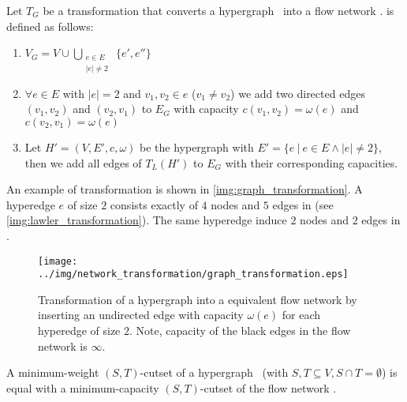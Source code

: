\begin{definition}
Let $T_G$ be a transformation that converts a hypergraph \HypergraphDef~into 
a flow network .  is defined as follows:
\begin{enumerate}
\item $V_G = V \cup \bigcup\limits_{\substack{e \in E \\ |e| \neq 2}}\ \{e', e''\}$
\item $\forall e \in E$ with $|e| = 2$ and $v_1,v_2 \in e$ ($v_1 \neq v_2$) we add 
      two directed edges $(v_1,v_2)$ and $(v_2,v_1)$ to $E_G$ with capacity $c(v_1,v_2) = \omega(e)$
      and $c(v_2,v_1) = \omega(e)$
\item Let $H' = (V,E',c,\omega)$ be the hypergraph with $E' = \{e\ |\ e \in E \land |e| \neq 2\}$,
      then we add all edges of $T_L(H')$ to $E_G$ with their corresponding capacities.
\end{enumerate} 
\end{definition}

An example of transformation  is shown in \autoref{img:graph_transformation}. A hyperedge
$e$ of size $2$ consists exactly of $4$ nodes and $5$ edges in  (see \autoref{img:lawler_transformation}).
The same hyperedge induce $2$ nodes and $2$ edges in . 
 
\begin{figure}
\centering
\texttt{[image: ../img/network\_transformation/graph\_transformation.eps]}
\caption{Transformation of a hypergraph into a equivalent flow network by inserting 
         an undirected edge with capacity $\omega(e)$ for each hyperedge of size $2$. 
         Note, capacity of the black edges in the flow network is $\infty$.}
\label{img:graph_transformation}
\end{figure}

\begin{theorem}
\label{theorem:st_cutset_equal_graph}
A minimum-weight $(S,T)$-cutset of a hypergraph \HypergraphDef~(with $S,T \subseteq V,
S \cap T = \emptyset$) is equal with a minimum-capacity $(S,T)$-cutset of the
flow network .
\label{theorem:heuer_network}
\end{theorem}

